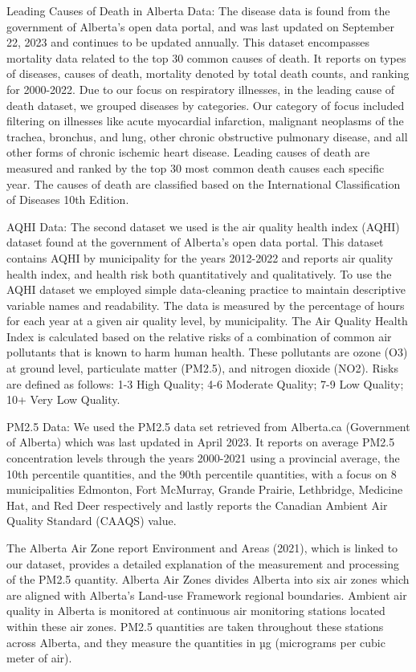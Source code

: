 \documentclass[
  letterpaper,
  DIV=11,
  numbers=noendperiod]{scrartcl}
\begin{document}
Leading Causes of Death in Alberta Data: The disease data is found from
the government of Alberta's open data portal, and was last updated on
September 22, 2023 and continues to be updated annually. This dataset
encompasses mortality data related to the top 30 common causes of death.
It reports on types of diseases, causes of death, mortality denoted by
total death counts, and ranking for 2000-2022. Due to our focus on
respiratory illnesses, in the leading cause of death dataset, we grouped
diseases by categories. Our category of focus included filtering on
illnesses like acute myocardial infarction, malignant neoplasms of the
trachea, bronchus, and lung, other chronic obstructive pulmonary
disease, and all other forms of chronic ischemic heart disease. Leading
causes of death are measured and ranked by the top 30 most common death
causes each specific year. The causes of death are classified based on
the International Classification of Diseases 10th Edition.

AQHI Data: The second dataset we used is the air quality health index
(AQHI) dataset found at the government of Alberta's open data portal.
This dataset contains AQHI by municipality for the years 2012-2022 and
reports air quality health index, and health risk both quantitatively
and qualitatively. To use the AQHI dataset we employed simple
data-cleaning practice to maintain descriptive variable names and
readability. The data is measured by the percentage of hours for each
year at a given air quality level, by municipality. The Air Quality
Health Index is calculated based on the relative risks of a combination
of common air pollutants that is known to harm human health. These
pollutants are ozone (O3) at ground level, particulate matter (PM2.5),
and nitrogen dioxide (NO2). Risks are defined as follows: 1-3 High
Quality; 4-6 Moderate Quality; 7-9 Low Quality; 10+ Very Low Quality.

PM2.5 Data: We used the PM2.5 data set retrieved from Alberta.ca
(Government of Alberta) which was last updated in April 2023. It reports
on average PM2.5 concentration levels through the years 2000-2021 using
a provincial average, the 10th percentile quantities, and the 90th
percentile quantities, with a focus on 8 municipalities Edmonton, Fort
McMurray, Grande Prairie, Lethbridge, Medicine Hat, and Red Deer
respectively and lastly reports the Canadian Ambient Air Quality
Standard (CAAQS) value.

The Alberta Air Zone report Environment and Areas (2021), which is
linked to our dataset, provides a detailed explanation of the
measurement and processing of the PM2.5 quantity. Alberta Air Zones
divides Alberta into six air zones which are aligned with Alberta's
Land-use Framework regional boundaries. Ambient air quality in Alberta
is monitored at continuous air monitoring stations located within these
air zones. PM2.5 quantities are taken throughout these stations across
Alberta, and they measure the quantities in µg (micrograms per cubic
meter of air).
\end{document}

